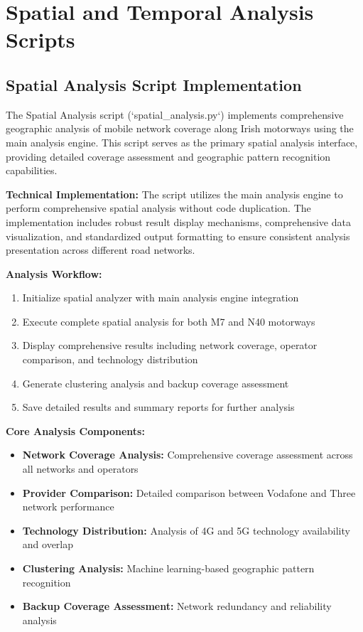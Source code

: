 \documentclass[MScCS]{uccthesis}
\begin{document}
\section{Spatial and Temporal Analysis Scripts}

\subsection{Spatial Analysis Script Implementation}
The Spatial Analysis script (`spatial\_analysis.py`) implements comprehensive geographic analysis of mobile network coverage along Irish motorways using the main analysis engine. This script serves as the primary spatial analysis interface, providing detailed coverage assessment and geographic pattern recognition capabilities.

\textbf{Technical Implementation:} The script utilizes the main analysis engine to perform comprehensive spatial analysis without code duplication. The implementation includes robust result display mechanisms, comprehensive data visualization, and standardized output formatting to ensure consistent analysis presentation across different road networks.

\textbf{Analysis Workflow:}
\begin{enumerate}
\item Initialize spatial analyzer with main analysis engine integration
\item Execute complete spatial analysis for both M7 and N40 motorways
\item Display comprehensive results including network coverage, operator comparison, and technology distribution
\item Generate clustering analysis and backup coverage assessment
\item Save detailed results and summary reports for further analysis
\end{enumerate}

\textbf{Core Analysis Components:}
\begin{itemize}
\item \textbf{Network Coverage Analysis:} Comprehensive coverage assessment across all networks and operators
\item \textbf{Provider Comparison:} Detailed comparison between Vodafone and Three network performance
\item \textbf{Technology Distribution:} Analysis of 4G and 5G technology availability and overlap
\item \textbf{Clustering Analysis:} Machine learning-based geographic pattern recognition
\item \textbf{Backup Coverage Assessment:} Network redundancy and reliability analysis
\end{itemize}
\end{document}
